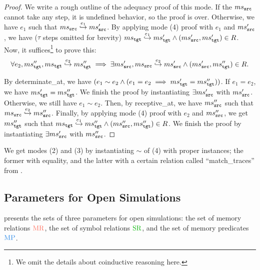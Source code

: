 \begin{proof}
We write a rough outline of the adequacy proof of this mode.
If the $ms{}_{\texttt{src}{}}$ cannot take any step, it is undefined behavior, so the proof is over. Otherwise, we have $e_1$ such that $ms{}_{\texttt{src}{}} \stackrel{e_1}{\hookrightarrow} ms{}_{\texttt{src}{}}'$.
By applying mode (4) proof with $e_1$ and $ms{}_{\texttt{src}{}}'$, we have ($\tau$ steps omitted for brevity) $ms{}_{\texttt{tgt}{}} \stackrel{e_1}{\hookrightarrow} ms{}_{\texttt{tgt}{}}' \land (ms{}_{\texttt{src}{}}', ms{}_{\texttt{tgt}{}}') \in R$. Now, it suffices\footnote{We omit the details about coinductive reasoning here.} to prove this:
\[\forall e_2, ms{}_{\texttt{tgt}{}}'', ms{}_{\texttt{tgt}{}} \stackrel{e_2}{\hookrightarrow} ms{}_{\texttt{tgt}{}}'' \implies \exists ms{}_{\texttt{src}{}}', ms{}_{\texttt{src}{}} \stackrel{e_2}{\hookrightarrow} ms{}_{\texttt{src}{}}' \land (ms{}_{\texttt{src}{}}', ms{}_{\texttt{tgt}{}}'') \in R.\]

By determinate\_at, we have $(e_1 \sim e_2 \land (e_1 = e_2 \implies ms{}_{\texttt{tgt}{}}' = ms{}_{\texttt{tgt}{}}''))$.
If $e_1 = e_2$, we have $ms{}_{\texttt{tgt}{}}' = ms{}_{\texttt{tgt}{}}''$. We finish the proof by instantiating $\exists ms{}_{\texttt{src}{}}'$ with $ms{}_{\texttt{src}{}}'$.
Otherwise, we still have $e_1 \sim e_2$.
Then, by receptive\_at, we have $ms{}_{\texttt{src}{}}''$ such that $ms{}_{\texttt{src}{}} \stackrel{e_2}{\hookrightarrow} ms{}_{\texttt{src}{}}''$.
Finally, by applying mode (4) proof with $e_2$ and $ms{}_{\texttt{src}{}}''$, we get $ms{}_{\texttt{tgt}{}}''$ such that $ms{}_{\texttt{tgt}{}} \stackrel{e_1}{\hookrightarrow} ms{}_{\texttt{tgt}{}}'' \land (ms{}_{\texttt{src}{}}'', ms{}_{\texttt{tgt}{}}'') \in R$.
We finish the proof by instantiating $\exists ms{}_{\texttt{src}{}}'$ with $ms{}_{\texttt{src}{}}''$.

\end{proof}

We get modes (2) and (3) by instantiating $\sim$ of (4) with proper instances; the former with equality, and the latter with a certain relation called ``match\_traces'' from \cc{}.

\subsection{Parameters for Open Simulations}
\label{sec:main-verification:parameter}

 presents
the sets of three parameters for open simulations:
the set of memory relations $\MREL$, the set of symbol relations $\SREL$, and the set of memory predicates $\MPRED$.

